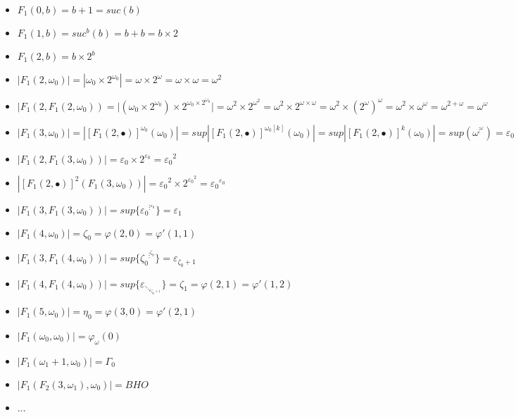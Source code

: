 \documentclass[10pt]{article}
\begin{document}
\begin{itemize}
     \setlength{\itemsep}{1pt}
     \setlength{\parskip}{0pt}
     \setlength{\parsep}{0pt}
\item \( F_1(0,b) = b+1 = suc(b) \)
\item \( F_1(1,b) = suc^b(b) = b+b = b \times 2\)
\item \( F_1(2,b) = b \times 2^b \)
\item \( |F_1(2,\omega_0)| = |\omega_0 \times 2^{\omega_0}| = \omega \times 2^\omega = \omega \times \omega = \omega^2 \)
\item \( |F_1(2,F_1(2,\omega_0)) = |(\omega_0 \times 2^{\omega_0}) \times 2^{\omega_0 \times 2^{\omega_0}}| = \omega^2 \times 2^{\omega^2} = \omega^2 \times 2^{\omega \times \omega} = \omega^2 \times (2^\omega)^\omega = \omega^2 \times \omega^\omega = \omega^{2+\omega} = \omega^\omega \) 
\item \( |F_1(3,\omega_0)| = |[F_1(2,\bullet)]^{\omega_0}(\omega_0)| = sup |[F_1(2,\bullet)]^{\omega_0[k]}(\omega_0)| = sup |[F_1(2,\bullet)]^k(\omega_0)| = sup (\omega^{\vdots^\omega}) = \varepsilon_0 \)
\item \( |F_1(2,F_1(3,\omega_0))| = \varepsilon_0 \times 2^{\varepsilon_0} = {\varepsilon_0}^2 \)
\item \( |[F_1(2,\bullet)]^2(F_1(3,\omega_0))| = {\varepsilon_0}^2 \times 2^{{\varepsilon_0}^2} = {\varepsilon_0}^{\varepsilon_0} \)
\item \( |F_1(3,F_1(3,\omega_0))| = sup \lbrace {\varepsilon_0}^{\vdots^{\varepsilon_0}} \rbrace = \varepsilon_1 \)
\item \( |F_1(4,\omega_0)| = \zeta_0 = \varphi(2,0) = \varphi'(1,1) \)
\item \( |F_1(3,F_1(4,\omega_0))| = sup \lbrace {\zeta_0}^{\vdots^{\zeta_0}} \rbrace = \varepsilon_{\zeta_0+1} \)
\item \( |F_1(4,F_1(4,\omega_0))| = sup \lbrace \varepsilon_{\ddots_{\varepsilon_{\zeta_0+1}}} \rbrace = \zeta_1 = \varphi(2,1) = \varphi'(1,2) \)
\item \( |F_1(5,\omega_0)| = \eta_0 = \varphi(3,0) = \varphi'(2,1) \)
\item \( |F_1(\omega_0,\omega_0)| = \varphi_\omega(0) \)
\item \( |F_1(\omega_1+1,\omega_0)| = \Gamma_0 \)
\item \( |F_1(F_2(3,\omega_1),\omega_0)| = BHO \)

\item \( \ldots \)
\end{itemize}
\end{document}
